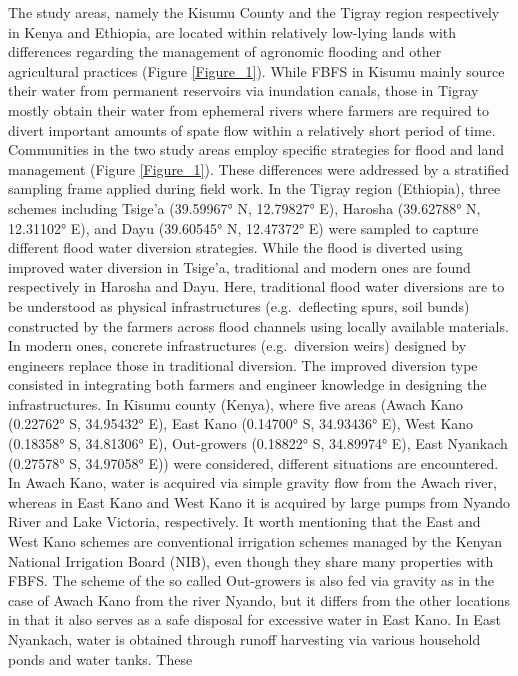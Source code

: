 \documentclass[11pt,preprint]{article}
\begin{document}
The study areas, namely the Kisumu County and the Tigray region
respectively in Kenya and Ethiopia, are located within relatively
low-lying lands with differences regarding the management of agronomic
flooding and other agricultural practices (Figure \ref{Figure_1}). While
FBFS in Kisumu mainly source their water from permanent reservoirs via
inundation canals, those in Tigray mostly obtain their water from
ephemeral rivers where farmers are required to divert important amounts
of spate flow within a relatively short period of time. Communities in
the two study areas employ specific strategies for flood and land
management (Figure \ref{Figure_1}). These differences were addressed by
a stratified sampling frame applied during field work. In the Tigray
region (Ethiopia), three schemes including Tsige'a (39.59967° N,
12.79827° E), Harosha (39.62788° N, 12.31102° E), and Dayu (39.60545° N,
12.47372° E) were sampled to capture different flood water diversion
strategies. While the flood is diverted using improved water diversion
in Tsige'a, traditional and modern ones are found respectively in
Harosha and Dayu. Here, traditional flood water diversions are to be
understood as physical infrastructures (e.g.~deflecting spurs, soil
bunds) constructed by the farmers across flood channels using locally
available materials. In modern ones, concrete infrastructures
(e.g.~diversion weirs) designed by engineers replace those in
traditional diversion. The improved diversion type consisted in
integrating both farmers and engineer knowledge in designing the
infrastructures. In Kisumu county (Kenya), where five areas (Awach Kano
(0.22762° S, 34.95432° E), East Kano (0.14700° S, 34.93436° E), West
Kano (0.18358° S, 34.81306° E), Out-growers (0.18822° S, 34.89974° E),
East Nyankach (0.27578° S, 34.97058° E)) were considered, different
situations are encountered. In Awach Kano, water is acquired via simple
gravity flow from the Awach river, whereas in East Kano and West Kano it
is acquired by large pumps from Nyando River and Lake Victoria,
respectively. It worth mentioning that the East and West Kano schemes
are conventional irrigation schemes managed by the Kenyan National
Irrigation Board (NIB), even though they share many properties with
FBFS. The scheme of the so called Out-growers is also fed via gravity as
in the case of Awach Kano from the river Nyando, but it differs from the
other locations in that it also serves as a safe disposal for excessive
water in East Kano. In East Nyankach, water is obtained through runoff
harvesting via various household ponds and water tanks. These
\end{document}
